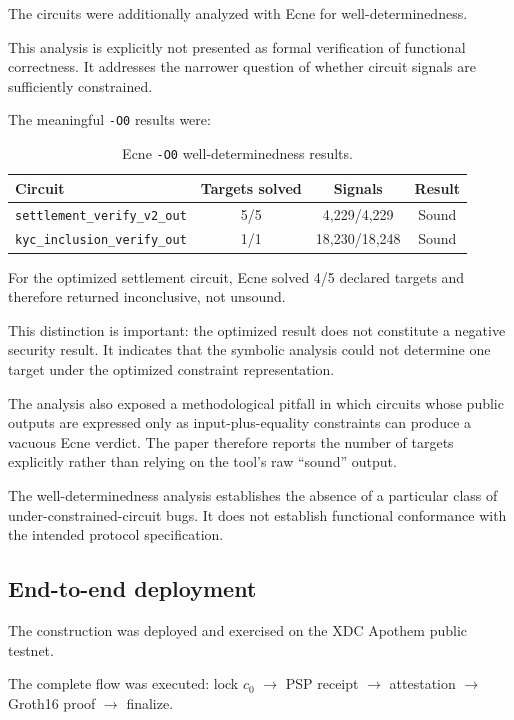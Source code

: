 \documentclass[10pt,twocolumn]{article}
\newcommand{\code}[1]{\texttt{#1}}
\begin{document}
The circuits were additionally analyzed with Ecne \cite{ecne} for
well-determinedness.

This analysis is explicitly not presented as formal verification of
functional correctness. It addresses the narrower question of whether
circuit signals are sufficiently constrained.

The meaningful \code{-O0} results were:

\begin{table}[t]
\centering
\begin{tabular}{@{}lccc@{}}
\toprule
Circuit & Targets solved & Signals & Result \\
\midrule
\code{settlement\_verify\_v2\_out} & 5/5 & 4{,}229/4{,}229 & Sound \\
\code{kyc\_inclusion\_verify\_out} & 1/1 & 18{,}230/18{,}248 & Sound \\
\bottomrule
\end{tabular}
\caption{Ecne \code{-O0} well-determinedness results.}
\end{table}

For the optimized settlement circuit, Ecne solved 4/5 declared targets
and therefore returned inconclusive, not unsound.

This distinction is important: the optimized result does not constitute
a negative security result. It indicates that the symbolic analysis
could not determine one target under the optimized constraint
representation.

The analysis also exposed a methodological pitfall in which circuits
whose public outputs are expressed only as input-plus-equality
constraints can produce a vacuous Ecne verdict. The paper therefore
reports the number of targets explicitly rather than relying on the
tool's raw ``sound'' output.

The well-determinedness analysis establishes the absence of a particular
class of under-constrained-circuit bugs. It does not establish
functional conformance with the intended protocol specification.

\subsection{End-to-end deployment}

The construction was deployed and exercised on the XDC Apothem public
testnet.

The complete flow was executed: lock $c_0$ $\rightarrow$ PSP receipt
$\rightarrow$ attestation $\rightarrow$ Groth16 proof $\rightarrow$
finalize.
\end{document}
